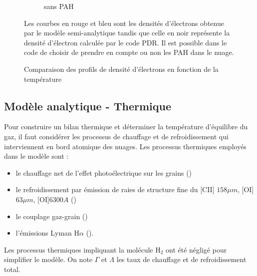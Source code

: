 \begin{figure}[!h]
\begin{subfigure}[t]{0.49\textwidth}
        \caption{sans PAH}
        \label{fig:Cl:model:recnoPAH}
    \end{subfigure}
    \caption{Comparaison des profils de densité d'électrons en fonction de la température}
    \begin{minipage}{\textwidth}
    Les courbes en rouge et bleu sont les densités d'électrons obtenue par le modèle semi-analytique tandis que celle en noir représente la densité d'électron calculée par le code PDR. Il est possible dans le code de choisir de prendre en compte ou non les PAH dans le nuage. 
    \end{minipage}
    \label{fig:Cl:model:rec}
\end{figure}




\subsection{Modèle analytique - Thermique}

Pour construire un bilan thermique et déterminer la température d'équilibre du gaz, il faut considérer les processus de chauffage et de refroidissement qui interviennent en bord atomique des nuages. Les processus thermiques employés dans le modèle sont :

\begin{itemize}
    \item le chauffage net de l'effet photoélectrique sur les grains (\cite{BakesTielens1994})
    \item le refroidissement par émission de raies de structure fine du [CII] $158 \mu m$,  [OI]$63 \mu m$, [OI]$6300A$ (\cite{Rollig2005})
    \item le couplage gaz-grain (\cite{Hollenbach1991})
    \item l'émissions Lyman $\mathrm{H}\alpha$ (\cite{tielens2005}).
\end{itemize}{}

Les processus thermiques impliquant la molécule $\mathrm{H}_2$ ont été négligé pour simplifier le modèle.
On note $\Gamma$ et $\Lambda$ les taux de chauffage et de refroidissement total.

